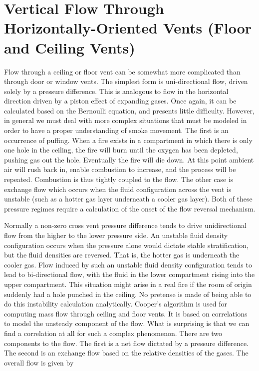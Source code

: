\section{Vertical Flow Through Horizontally-Oriented Vents (Floor and Ceiling Vents)}

Flow through a ceiling or floor vent can be somewhat more complicated than through door or window vents.  The simplest form is uni-directional flow, driven solely by a pressure difference.  This is analogous to flow in the horizontal direction driven by a piston effect of expanding gases.  Once again, it can be calculated based on the Bernoulli equation, and presents little difficulty.  However, in general we must deal with more complex situations that must be modeled in order to have a proper understanding of smoke movement.  The first is an occurrence of puffing.  When a fire exists in a compartment in which there is only one hole in the ceiling, the fire will burn until the oxygen has been depleted, pushing gas out the hole.  Eventually the fire will die down.  At this point ambient air will rush back in, enable combustion to increase, and the process will be repeated.  Combustion is thus tightly coupled to the flow.  The other case is exchange flow which occurs when the fluid configuration across the vent is unstable (such as a hotter gas layer underneath a cooler gas layer).  Both of these pressure regimes require a calculation of the onset of the flow reversal mechanism.

Normally a non-zero cross vent pressure difference tends to drive unidirectional flow from the higher to the lower pressure side.  An unstable fluid density configuration occurs when the pressure alone would dictate stable stratification, but the fluid densities are reversed.  That is, the hotter gas is underneath the cooler gas.  Flow induced by such an unstable fluid density configuration tends to lead to bi-directional flow, with the fluid in the lower compartment rising into the upper compartment.  This situation might arise in a real fire if the room of origin suddenly had a hole punched in the ceiling. No pretense is made of being able to do this instability calculation analytically. Cooper's algorithm \cite{Cooper:1989} is used for computing mass flow through ceiling and floor vents. It is based on correlations to model the unsteady component of the flow.  What is surprising is that we can find a correlation at all for such a complex phenomenon. There are two components to the flow.  The first is a net flow dictated by a pressure difference. The second is an exchange flow based on the relative densities of the gases.  The overall flow is given by \cite{Cooper:1989, Cooper:1990, Cooper:1995}

